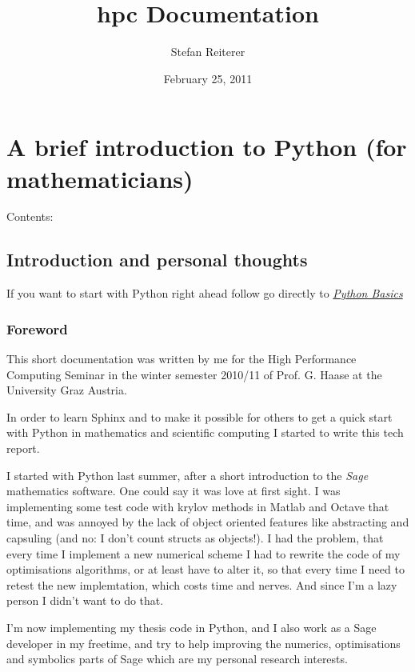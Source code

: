 \documentclass[letterpaper,10pt,english]{manual}
\title{hpc Documentation}
\date{February 25, 2011}
\author{Stefan Reiterer}
\begin{document}
\maketitle
\tableofcontents
\hypertarget{--doc-index}{}



\chapter{A brief introduction to Python (for mathematicians)}

Contents:

\resetcurrentobjects
\hypertarget{--doc-Introduction}{}

\section{Introduction and personal thoughts}

If you want to start with Python right ahead  follow go directly to \hyperlink{basics-ref}{\emph{Python Basics}}


\subsection{Foreword}

This short documentation was written by me for the High Performance Computing Seminar
in the winter semester 2010/11 of Prof. G. Haase at the University Graz Austria.

In order to learn Sphinx and to make it possible for others to get a
quick start with Python in mathematics and scientific computing I started to write this tech report.

I started with Python last summer, after a short introduction to the \emph{Sage} mathematics software. One could
say it was love at first sight. I was implementing some test code with krylov methods in Matlab and Octave that
time, and was annoyed by the lack of object oriented features like
abstracting and capsuling (and no: I don't count structs as objects!). I had the problem, that
every time I implement a new numerical scheme I had to rewrite the code of my optimisations algorithms, or at least have
to alter it, so that every time I need to retest the new implemtation, which costs time and nerves. And since I'm a
lazy person I didn't want to do that.

I'm now implementing my thesis code in Python, and I also work as a Sage developer in my freetime, and try to help
improving the numerics, optimisations and symbolics parts of Sage which are my personal research interests.
\end{document}
